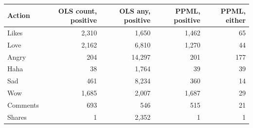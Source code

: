 \begin{tabular}{lrrrr}
\toprule
Action & OLS count, positive & OLS any, positive & PPML, positive & PPML, either \\
\midrule
Likes & 2,310 & 1,650 & 1,462 & 65 \\
Love & 2,162 & 6,810 & 1,270 & 44 \\
Angry & 204 & 14,297 & 201 & 177 \\
Haha & 38 & 1,764 & 39 & 39 \\
Sad & 461 & 8,234 & 360 & 14 \\
Wow & 1,685 & 2,007 & 1,687 & 29 \\
Comments & 693 & 546 & 515 & 21 \\
Shares & 1 & 2,352 & 1 & 1 \\
\bottomrule
\end{tabular}
